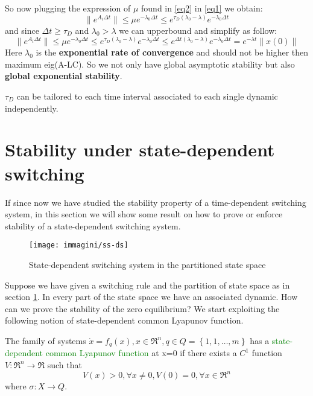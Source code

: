 So now plugging the expression of $\mu$ found in \ref{eq2} in \ref{eq1} we obtain:
\begin{equation} \label{eq3}
	\|e^{A_i\Delta t}\| \le \mu e^{-\lambda_0\Delta t}\le e^{\tau_D(\lambda_0-\lambda)}e^{-\lambda_0\Delta t}
\end{equation}
and since $\Delta t \ge \tau_D$ and $\lambda_0 > \lambda$ we can upperbound and simplify as follow:
\begin{equation}
 		\|e^{A_i\Delta t}\| \le \mu e^{-\lambda_0\Delta t}\le e^{\tau_D(\lambda_0-\lambda)}e^{-\lambda_0\Delta t} \le e^{\Delta t(\lambda_0-\lambda)}e^{-\lambda_0\Delta t}=\boxed{e^{-\lambda t}\|x(0)\|}
\end{equation}
Here $\lambda_0$ is the \textbf{exponential rate of convergence} and should not be higher then maximum eig(A-LC). So we not only have global asymptotic stability but also \textbf{global exponential stability}.
\begin{remark}
	$\tau_D$ can be tailored to each time interval associated to each single dynamic independently.
\end{remark}
\section{Stability under state-dependent switching}
If since now we have studied the stability property of a time-dependent switching system, in this section we will show some result on how to prove or enforce stability of a state-dependent switching system.
\linebreak[2]
\begin{figure}[H]
	\centering
	\texttt{[image: immagini/ss-ds]}
	\caption{State-dependent switching system in the partitioned state space}
	\label{fig:ss-ds}
\end{figure}
Suppose we have given a switching rule and the partition of state space as in section \ref{fig:ss-ds}. In every part of the state space we have an associated dynamic. How can we prove the stability of the zero equilibrium? We start exploiting the following notion of state-dependent common Lyapunov function.
\begin{defn}
	The family of systems $\dot{x}=f_q(x), x \in \Re^n, q \in Q=\left\{1,1,\dots,m\right\}$ has a \textcolor{green}{state-dependent common Lyapunov function} at x=0 if there exists a $C^1$ function $V\colon \Re^n\to\Re$ such that
	\[
	V(x)>0, \forall x\neq 0, V(0)=0	
		, \forall x \in \Re^n
	\]
	where $\sigma\colon X \to Q$.
\end{defn}

